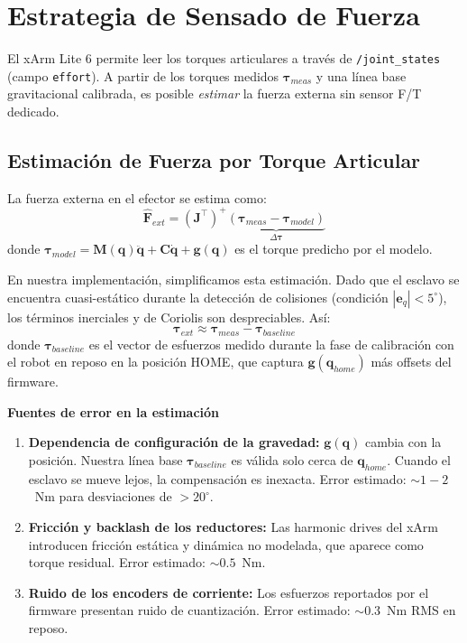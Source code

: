\documentclass[journal,10pt,twoside]{IEEEtran}
\begin{document}
\section{Estrategia de Sensado de Fuerza}
\label{sec:force}

\begin{theorybox}
  El xArm Lite 6 permite leer los torques articulares a través de
  \texttt{/joint\_states} (campo \texttt{effort}). A partir de los torques
  medidos $\bm{\tau}_{meas}$ y una línea base gravitacional calibrada,
  es posible \emph{estimar} la fuerza externa sin sensor F/T dedicado.
\end{theorybox}

\subsection{Estimación de Fuerza por Torque Articular}

La fuerza externa en el efector se estima como:
\begin{equation}
  \hat{\bm{F}}_{ext} = \left(\bm{J}^\top\right)^+
    \underbrace{\left(\bm{\tau}_{meas} - \bm{\tau}_{model}\right)}_{\Delta\bm{\tau}}
  \label{eq:force_estimate}
\end{equation}
donde $\bm{\tau}_{model} = \bm{M}(\bm{q})\ddot{\bm{q}} +
\bm{C}\dot{\bm{q}} + \bm{g}(\bm{q})$ es el torque predicho por el modelo.

En nuestra implementación, simplificamos esta estimación. Dado que el
esclavo se encuentra cuasi-estático durante la detección de colisiones
(condición $|\bm{e}_q|<5^\circ$), los términos inerciales y de Coriolis
son despreciables. Así:
\begin{equation}
  \bm{\tau}_{ext} \approx \bm{\tau}_{meas} - \bm{\tau}_{baseline}
  \label{eq:our_estimate}
\end{equation}
donde $\bm{\tau}_{baseline}$ es el vector de esfuerzos medido durante
la fase de calibración con el robot en reposo en la posición HOME,
que captura $\bm{g}(\bm{q}_{home})$ más offsets del firmware.

\textbf{Fuentes de error en la estimación}
\begin{enumerate}
  \item \textbf{Dependencia de configuración de la gravedad:}
        $\bm{g}(\bm{q})$ cambia con la posición. Nuestra línea base
        $\bm{\tau}_{baseline}$ es válida solo cerca de $\bm{q}_{home}$.
        Cuando el esclavo se mueve lejos, la compensación es inexacta.
        Error estimado: $\sim1{-}2$~Nm para desviaciones de $>20^\circ$.
  \item \textbf{Fricción y backlash de los reductores:}
        Las harmonic drives del xArm introducen fricción estática y
        dinámica no modelada, que aparece como torque residual.
        Error estimado: $\sim0{.}5$~Nm.
  \item \textbf{Ruido de los encoders de corriente:}
        Los esfuerzos reportados por el firmware presentan ruido de
        cuantización. Error estimado: $\sim0{.}3$~Nm RMS en reposo.
\end{enumerate}
\end{document}
